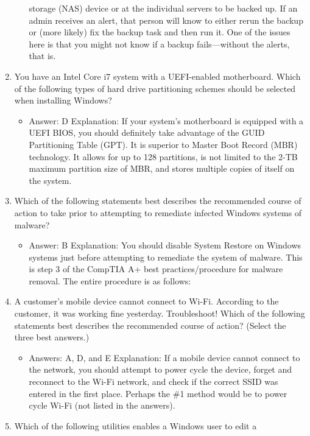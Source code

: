 \documentclass{article}
\begin{document}
\begin{enumerate}
\begin{itemize}
storage (NAS) device or at the individual servers to be backed up. If an admin
receives an alert, that person will know to either rerun the backup or (more likely) fix
the backup task and then run it. One of the issues here is that you might not know if a
backup fails—without the alerts, that is.
    \end{itemize}
    \item You have an Intel Core i7 system with a UEFI-enabled motherboard.
Which of the following types of hard drive partitioning
schemes should be selected when installing Windows?
    \begin{itemize}
        \item  Answer: D
Explanation: If your system’s motherboard is equipped with a UEFI BIOS, you should
definitely take advantage of the GUID Partitioning Table (GPT). It is superior to Master
Boot Record (MBR) technology. It allows for up to 128 partitions, is not limited to the
2-TB maximum partition size of MBR, and stores multiple copies of itself on the
system.
    \end{itemize}
    \item Which of the following statements best describes the recommended
course of action to take prior to attempting to remediate
infected Windows systems of malware?
    \begin{itemize}
        \item Answer: B
Explanation: You should disable System Restore on Windows systems just before
attempting to remediate the system of malware. This is step 3 of the CompTIA A+ best
practices/procedure for malware removal. The entire procedure is as follows:
    \end{itemize}
    \item A customer’s mobile device cannot connect to Wi-Fi. According to
the customer, it was working fine yesterday. Troubleshoot! Which
of the following statements best describes the recommended
course of action? (Select the three best answers.)
    \begin{itemize}
        \item Answers: A, D, and E
Explanation: If a mobile device cannot connect to the network, you should attempt to
power cycle the device, forget and reconnect to the Wi-Fi network, and check if the
correct SSID was entered in the first place. Perhaps the \#1 method would be to power
cycle Wi-Fi (not listed in the answers).
    \end{itemize}
    \item Which of the following utilities enables a Windows user to edit a

\end{enumerate}
\end{document}
